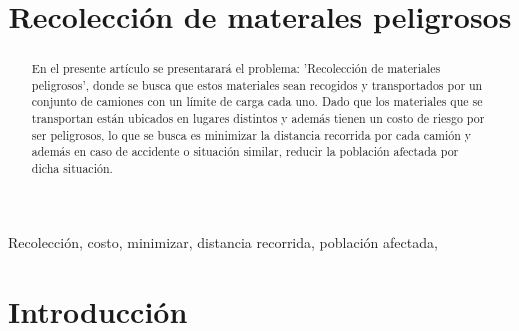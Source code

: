 \documentclass[conference]{IEEEtran}
\begin{document}
\title{Recolecci\'on de materales peligrosos\\
}

\author{

}

\maketitle

\begin{abstract}

En el presente art\'iculo se presentarar\'a el problema: 'Recolecci\'on de materiales peligrosos', donde se busca que estos materiales sean recogidos y transportados por un conjunto de camiones con un límite de carga cada uno. Dado que los materiales que se transportan est\'an ubicados en lugares distintos y adem\'as tienen un costo de riesgo por ser peligrosos, lo que se busca es minimizar la distancia recorrida por cada camión y además en caso de accidente o situación similar, reducir la población afectada por dicha situación.

\end{abstract}

\begin{IEEEkeywords}
Recolecci\'on, costo, minimizar, distancia recorrida, poblaci\'on afectada,
\end{IEEEkeywords}

\section{Introducci\'on}
\end{document}
